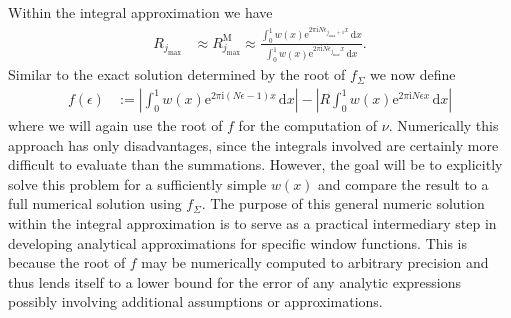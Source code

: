 \documentclass[english, parskip=full]{scrartcl}     %
\newcommand{\intx}{}
\newcommand{\kla}{}
\newcommand{\tecxt}{}
\renewcommand{\i}{\text{i}}
\newcommand{\e}{\text{e}}
\begin{document}
Within the integral approximation we have
\begin{align}
R_{j_\tecxt\text{max}} &\approx R_{j_\tecxt\text{max}}^\tecxt\text{M} \approx \frac{\intx\int_{0}^{1} w(x) \e^{2\pi\i N \epsilon_{j_\text{max} + 1} x} \, \mathrm{d}x}{\intx\int_{0}^{1} w(x) \e^{2\pi\i N\epsilon_{j_\text{max}} x} \, \mathrm{d}x}. \label{eqn:R j integral approximation}
\end{align}
Similar to the exact solution determined by the root of $f_\Sigma$ we now define
\begin{align}
f(\epsilon) &:= \left\vert \int_{0}^{1} w(x) \e^{2\pi\i \kla\left( N\epsilon - 1 \right)x} \, \mathrm{d}x \right\vert - \left\vert R\intx\int_{0}^{1} w(x) \e^{2\pi\i N\epsilon x} \, \mathrm{d}x \right\vert \label{eqn:definition f eps integral repr}
\end{align}
where we will again use the root of $f$ for the computation of $\nu$.
Numerically this approach has only disadvantages, since the integrals involved are certainly more difficult to evaluate than the summations.
However, the goal will be to explicitly solve this problem for a sufficiently simple $w(x)$ and compare the result to a full numerical solution using $f_\Sigma$.
The purpose of this general numeric solution within the integral approximation is to serve as a practical intermediary step in developing analytical approximations for specific window functions.
This is because the root of $f$ may be numerically computed to arbitrary precision and thus lends itself to a lower bound for the error of any analytic expressions possibly involving additional assumptions or approximations.
\end{document}
